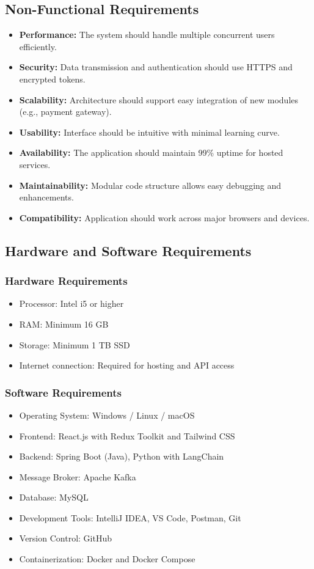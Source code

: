\documentclass[12pt,a4paper]{report}
\begin{document}
\subsection{Non-Functional Requirements}

\begin{itemize}
    \item \textbf{Performance:} The system should handle multiple concurrent users efficiently.
    \item \textbf{Security:} Data transmission and authentication should use HTTPS and encrypted tokens.
    \item \textbf{Scalability:} Architecture should support easy integration of new modules (e.g., payment gateway).
    \item \textbf{Usability:} Interface should be intuitive with minimal learning curve.
    \item \textbf{Availability:} The application should maintain 99\% uptime for hosted services.
    \item \textbf{Maintainability:} Modular code structure allows easy debugging and enhancements.
    \item \textbf{Compatibility:} Application should work across major browsers and devices.
\end{itemize}

\subsection{Hardware and Software Requirements}

\subsubsection*{Hardware Requirements}
\begin{itemize}
    \item Processor: Intel i5 or higher
    \item RAM: Minimum 16 GB
    \item Storage: Minimum 1 TB SSD
    \item Internet connection: Required for hosting and API access
\end{itemize}

\subsubsection*{Software Requirements}
\begin{itemize}
    \item Operating System: Windows / Linux / macOS
    \item Frontend: React.js with Redux Toolkit and Tailwind CSS
    \item Backend: Spring Boot (Java), Python with LangChain
    \item Message Broker: Apache Kafka
    \item Database: MySQL
    \item Development Tools: IntelliJ IDEA, VS Code, Postman, Git
    \item Version Control: GitHub
    \item Containerization: Docker and Docker Compose
\end{itemize}
\end{document}

